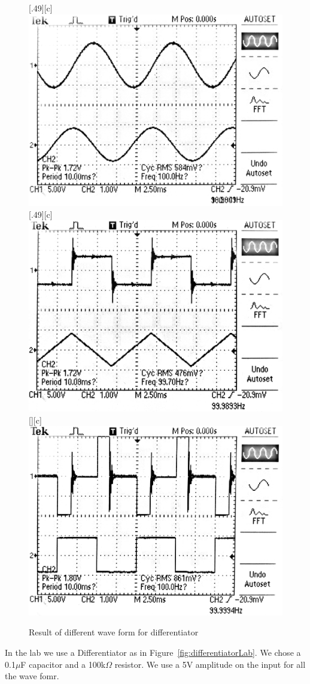 \documentclass[aps,prl,reprint]{revtex4-1}
\begin{document}
        \begin{figure}[b]
            \centering
            [.49\linewidth][c]{%
                \includegraphics[width=.49\linewidth]{image/differentiator/sine.pdf}}
            [.49\linewidth][c]{%
                \includegraphics[width=.49\linewidth]{image/differentiator/tri.pdf}}
            [\linewidth][c]{%
                \includegraphics[width=.7\linewidth]{image/differentiator/sqr.pdf}}
            \caption{Result of different wave form for differentiator}
            \label{fig:differentiatorWave}
        \end{figure}
        In the lab we use a Differentiator as in Figure~\ref{fig:differentiatorLab}. We chose a 0.1$\mu$F capacitor and a 100k$\Omega$ resistor. We use a 5V amplitude on the input for all the wave fomr.
\end{document}
